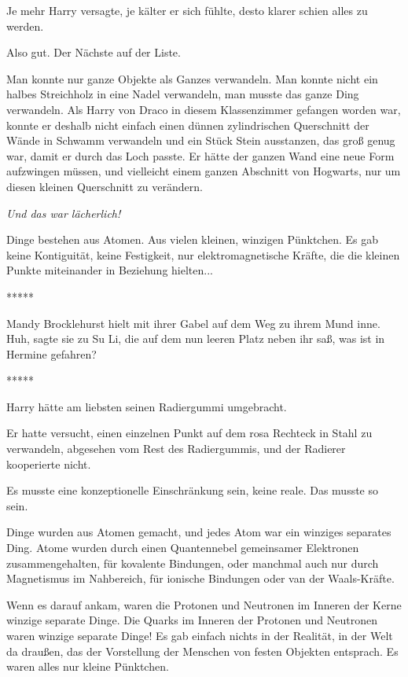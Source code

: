 Je mehr Harry versagte, je kälter er sich fühlte, desto klarer schien alles zu
werden.

Also gut. Der Nächste auf der Liste.

Man konnte nur ganze Objekte als Ganzes verwandeln. Man konnte nicht ein halbes
Streichholz in eine Nadel verwandeln, man musste das ganze Ding verwandeln. Als
Harry von Draco in diesem Klassenzimmer gefangen worden war, konnte er deshalb
nicht einfach einen dünnen zylindrischen Querschnitt der Wände in Schwamm
verwandeln und ein Stück Stein ausstanzen, das groß genug war, damit er durch
das Loch passte. Er hätte der ganzen Wand eine neue Form aufzwingen müssen, und
vielleicht einem ganzen Abschnitt von Hogwarts, nur um diesen kleinen
Querschnitt zu verändern.

\emph{Und das war lächerlich!}

Dinge bestehen aus Atomen. Aus vielen kleinen, winzigen Pünktchen. Es gab keine
Kontiguität, keine Festigkeit, nur elektromagnetische Kräfte, die die kleinen
Punkte miteinander in Beziehung hielten...

\begin{center}*****\end{center}

Mandy Brocklehurst hielt mit ihrer Gabel auf dem Weg zu ihrem Mund inne.
\glqq{}Huh\grqq{}, sagte sie zu Su Li, die auf dem nun leeren Platz neben ihr
saß, \glqq{}was ist in Hermine gefahren?\grqq{}

\begin{center}*****\end{center}

Harry hätte am liebsten seinen Radiergummi umgebracht.

Er hatte versucht, einen einzelnen Punkt auf dem rosa Rechteck in Stahl zu
verwandeln, abgesehen vom Rest des Radiergummis, und der Radierer kooperierte
nicht.

Es musste eine konzeptionelle Einschränkung sein, keine reale. Das musste so
sein.

Dinge wurden aus Atomen gemacht, und jedes Atom war ein winziges separates Ding.
Atome wurden durch einen Quantennebel gemeinsamer Elektronen zusammengehalten,
für kovalente Bindungen, oder manchmal auch nur durch Magnetismus im Nahbereich,
für ionische Bindungen oder van der Waals-Kräfte.

Wenn es darauf ankam, waren die Protonen und Neutronen im Inneren der Kerne
winzige separate Dinge. Die Quarks im Inneren der Protonen und Neutronen waren
winzige separate Dinge! Es gab einfach nichts in der Realität, in der Welt da
draußen, das der Vorstellung der Menschen von festen Objekten entsprach. Es
waren alles nur kleine Pünktchen.


